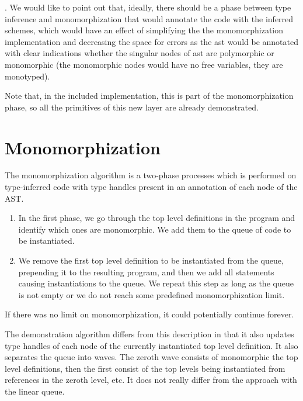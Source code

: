 \begin{defn}
    . We would like to point out that, ideally, there should be a phase between type inference and monomorphization that would annotate the code with the inferred schemes, which would have an effect of simplifying the the monomorphization implementation and decreasing the space for errors as the ast would be annotated with clear indications whether the singular nodes of ast are polymorphic or monomorphic (the monomorphic nodes would have no free variables, they are monotyped).

    Note that, in the included implementation, this is part of the monomorphization phase, so all the primitives of this new layer are already demonstrated.
\end{defn}

\section{Monomorphization}

The monomorphization algorithm is a two-phase processes which is performed on type-inferred code with type handles present in an annotation of each node of the AST.

\begin{enumerate}
    \item In the first phase, we go through the top level definitions in the program and identify which ones are monomorphic. We add them to the queue of code to be instantiated.

    \item We remove the first top level definition to be instantiated from the queue, prepending it to the resulting program, and then we add all statements causing instantiations to the queue. We repeat this step as long as the queue is not empty or we do not reach some predefined monomorphization limit.
\end{enumerate}


If there was no limit on monomorphization, it could potentially continue forever.


The demonstration algorithm differs from this description in that it also updates type handles  of each node of the currently instantiated top level definition. It also separates the queue into waves. The zeroth wave consists of monomorphic the top level definitions, then the first consist of the top levels being instantiated from references in the zeroth level, etc. It does not really differ from the approach with the linear queue. 

